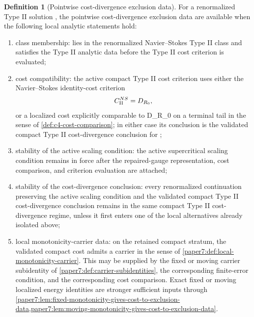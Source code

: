 \documentclass[11pt]{amsart}
\def\({}%
\def\){}%
\def\tilde#1{#1}%
\def\mathfrak#1{#1}%
\theoremstyle{plain}
\theoremstyle{definition}
\newtheorem{definition}[definition]{Definition}
\theoremstyle{remark}
\begin{document}
\begin{definition}[Pointwise cost-divergence exclusion data]\label{paper7:def:cost-exclusion-data}
For a renormalized Type II solution \(\omega\), the pointwise
cost-divergence exclusion data are available when the following local analytic
statements hold:
\begin{enumerate}[label=\textup{(\roman*)}]
\item class membership: \(\omega\) lies in the renormalized Navier--Stokes
Type II class and satisfies the Type II analytic data before the Type II cost
criterion is evaluated;
\item cost compatibility: the active compact Type II cost criterion uses either
the Navier--Stokes identity-cost criterion
\[
  \mathfrak C_{\rm II}^{NS}=\tilde{\mathfrak D}_{R_0},
\]
or a localized cost explicitly comparable to
\(\tilde{\mathfrak D}_{R_0}\) on a terminal tail in the sense of
\cref{def:c4-cost-comparison}; in either case its conclusion is the validated
compact Type II cost-divergence conclusion for \(\omega\);
\item stability of the active scaling condition: the active supercritical
scaling condition remains in force after the repaired-gauge representation,
cost comparison, and criterion evaluation are attached;
\item stability of the cost-divergence conclusion: every renormalized
continuation preserving the active scaling condition and the validated compact
Type II cost-divergence conclusion remains in the same compact Type II
cost-divergence regime, unless it first enters one of the local alternatives
already isolated above;
\item local monotonicity-carrier data: on the retained compact stratum, the
validated compact cost admits a carrier in the sense of
\cref{paper7:def:local-monotonicity-carrier}.  This may be supplied by the
fixed or moving carrier subidentity of
\cref{paper7:def:carrier-subidentities}, the corresponding finite-error
condition, and the corresponding cost comparison.  Exact fixed or moving
localized energy identities are stronger sufficient inputs through
\cref{paper7:lem:fixed-monotonicity-gives-cost-to-exclusion-data,paper7:lem:moving-monotonicity-gives-cost-to-exclusion-data}.
\end{enumerate}
\end{definition}
\end{document}
